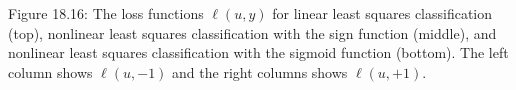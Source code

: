 
Figure 18.16: The loss functions \(\ell(u,y)\) for linear least squares classification (top), nonlinear least squares classification with the sign function (middle), and nonlinear least squares classification with the sigmoid function (bottom). The left column shows \(\ell(u,-1)\) and the right columns shows \(\ell(u,+1)\).

 